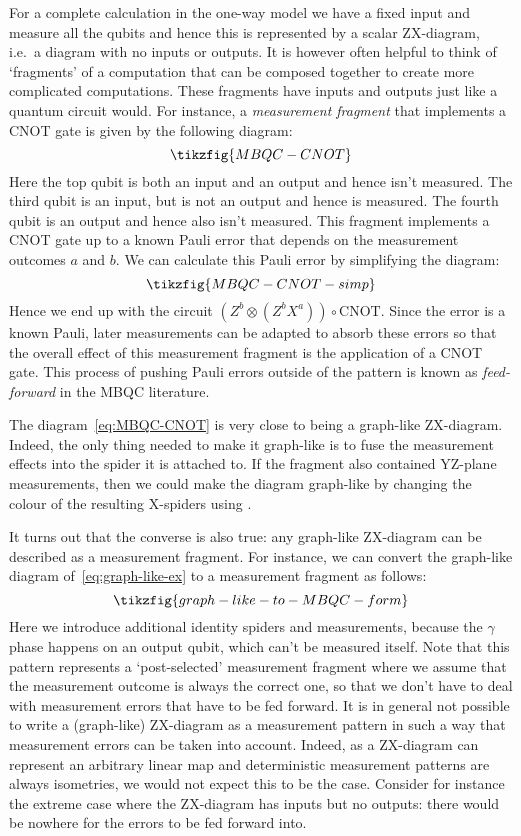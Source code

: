 \documentclass[a4paper,onecolumn,superscriptaddress,11pt,%
				unpublished,%
				allowfontchageintitle,%
				]{quantumarticle}
\begin{document}
For a complete calculation in the one-way model we have a fixed input and measure all the qubits and hence this is represented by a scalar ZX-diagram, i.e.~a diagram with no inputs or outputs. It is however often helpful to think of `fragments' of a computation that can be composed together to create more complicated computations. These fragments have inputs and outputs just like a quantum circuit would.
For instance, a \emph{measurement fragment} that implements a CNOT gate is given by the following diagram:
\begin{equation}\label{eq:MBQC-CNOT}
	\tikzfig{MBQC-CNOT}
\end{equation}
Here the top qubit is both an input and an output and hence isn't measured. The third qubit is an input, but is not an output and hence is measured. The fourth qubit is an output and hence also isn't measured. This fragment implements a CNOT gate up to a known Pauli error that depends on the measurement outcomes $a$ and $b$. We can calculate this Pauli error by simplifying the diagram:
\begin{equation}
	\tikzfig{MBQC-CNOT-simp}
\end{equation}
Hence we end up with the circuit $(Z^b\otimes (Z^bX^a))\circ \text{CNOT}$. Since the error is a known Pauli, later measurements can be adapted to absorb these errors so that the overall effect of this measurement fragment is the application of a CNOT gate. This process of pushing Pauli errors outside of the pattern is known as \emph{feed-forward} in the MBQC literature.

The diagram~\eqref{eq:MBQC-CNOT} is very close to being a graph-like ZX-diagram. Indeed, the only thing needed to make it graph-like is to fuse the measurement effects into the spider it is attached to. If the fragment also contained YZ-plane measurements, then we could make the diagram graph-like by changing the colour of the resulting X-spiders using \HadamardRule.

It turns out that the converse is also true: any graph-like ZX-diagram can be described as a measurement fragment. For instance, we can convert the graph-like diagram of~\eqref{eq:graph-like-ex} to a measurement fragment as follows:
\begin{equation}
	\tikzfig{graph-like-to-MBQC-form}
\end{equation}
Here we introduce additional identity spiders and measurements, because the $\gamma$ phase happens on an output qubit, which can't be measured itself. Note that this pattern represents a `post-selected' measurement fragment where we assume that the measurement outcome is always the correct one, so that we don't have to deal with measurement errors that have to be fed forward. 
It is in general not possible to write a (graph-like) ZX-diagram as a measurement pattern in such a way that measurement errors can be taken into account. Indeed, as a ZX-diagram can represent an arbitrary linear map and deterministic measurement patterns are always isometries, we would not expect this to be the case. Consider for instance the extreme case where the ZX-diagram has inputs but no outputs: there would be nowhere for the errors to be fed forward into.
\end{document}
